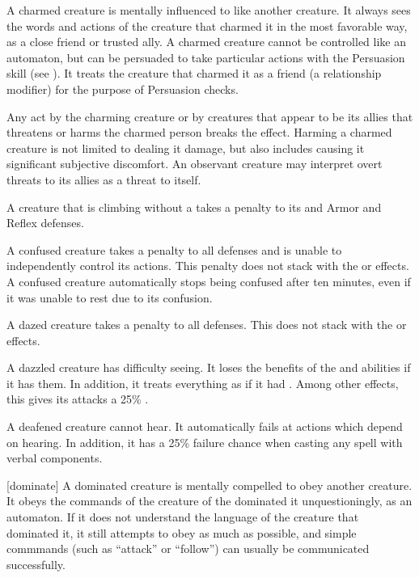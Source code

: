      A charmed creature is mentally influenced to like another creature.
    It always sees the words and actions of the creature that charmed it in the most favorable way, as a close friend or trusted ally.
    A charmed creature cannot be controlled like an automaton, but can be persuaded to take particular actions with the Persuasion skill (see ).
    It treats the creature that charmed it as a friend (a  relationship modifier) for the purpose of Persuasion checks.

    Any act by the charming creature or by creatures that appear to be its allies that threatens or harms the charmed person breaks the effect.
    Harming a charmed creature is not limited to dealing it damage, but also includes causing it significant subjective discomfort.
    An observant creature may interpret overt threats to its allies as a threat to itself.

     A creature that is climbing without a  takes a  penalty to its  and Armor and Reflex defenses.

     A confused creature takes a  penalty to all defenses and is unable to independently control its actions.
    This penalty does not stack with the \dazed or \stunned effects.
    \confusionexplanation
    A confused creature automatically stops being confused after ten minutes, even if it was unable to rest due to its confusion.

     A dazed creature takes a  penalty to all defenses.
    This does not stack with the \stunned or \confused effects.

     A dazzled creature has difficulty seeing.
    It loses the benefits of the  and  abilities if it has them.
    In addition, it treats everything as if it had .
    Among other effects, this gives its  attacks a 25\% .

     A deafened creature cannot hear. It automatically fails at actions which depend on hearing. In addition, it has a 25\% failure chance when casting any spell with verbal components.

    [dominate] A dominated creature is mentally compelled to obey another creature.
    It obeys the commands of the creature of the dominated it unquestioningly, as an automaton.
    If it does not understand the language of the creature that dominated it, it still attempts to obey as much as possible, and simple commmands (such as ``attack'' or ``follow'') can usually be communicated successfully.

